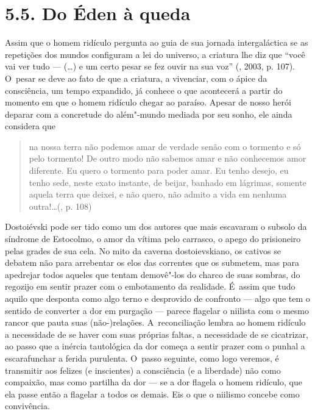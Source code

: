 \section{5.5. Do Éden à queda}

Assim que o homem ridículo pergunta ao guia de sua jornada
intergaláctica se as repetições dos mundos configuram a lei do universo,
a criatura lhe diz que ``você vai ver tudo --- (\ldots) e um certo pesar se
fez ouvir na sua voz'' (, 2003, p. 107). O~pesar se deve ao
fato de que a criatura, a vivenciar, com o ápice da consciência, um
tempo expandido, já conhece o que acontecerá a partir do momento em que
o homem ridículo chegar ao paraíso. Apesar de nosso herói deparar com a
concretude do além"-mundo mediada por seu sonho, ele ainda considera que

\begin{quote}
na nossa terra não podemos amar de verdade senão com o tormento e só
pelo tormento! De outro modo não sabemos amar e não conhecemos amor
diferente. Eu quero o tormento para poder amar. Eu tenho desejo, eu
tenho sede, neste exato instante, de beijar, banhado em lágrimas,
somente aquela terra que deixei, e não quero, não admito a vida em
nenhuma outra!\ldots (, p. 108)
\end{quote}

Dostoiévski pode ser tido como um dos autores que mais escavaram o
subsolo da síndrome de Estocolmo, o amor da vítima pelo carrasco, o
apego do prisioneiro pelas grades de sua cela. No mito da caverna
dostoievskiano, os cativos se debatem não para arrebentar os elos das
correntes que os submetem, mas para apedrejar todos aqueles que tentam
demovê"-los do charco de suas sombras, do regozijo em sentir prazer com o
embotamento da realidade. É~assim que tudo aquilo que desponta como algo
terno e desprovido de confronto --- algo que tem o sentido de converter a
dor em purgação --- parece flagelar o niilista com o mesmo rancor que
pauta suas \mbox{(não-)relações}. A~reconciliação lembra ao homem ridículo a
necessidade de se haver com suas próprias faltas, a necessidade de se
cicatrizar, ao passo que a inércia tautológica da dor começa a sentir
prazer com o punhal a escarafunchar a ferida purulenta. O~passo
seguinte, como logo veremos, é transmitir aos felizes (e inscientes) a
consciência (e a liberdade) não como compaixão, mas como partilha da dor
--- se a dor flagela o homem ridículo, que ela passe então a flagelar a
todos os demais. Eis o que o niilismo concebe como convivência.

